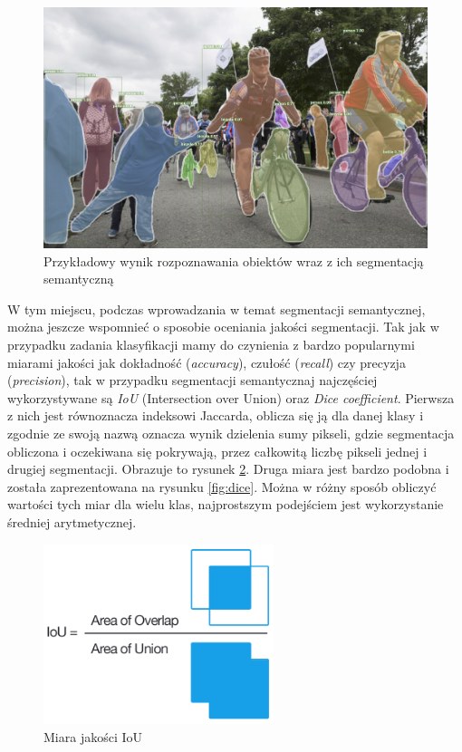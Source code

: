 \documentclass{classrep}
\begin{document}
{        \begin{figure}[!htbp]
            \centering
            \includegraphics[width=\textwidth]{img/instance_segmentation_example.jpg}
            \caption
            {Przykładowy wynik rozpoznawania obiektów wraz z ich segmentacją semantyczną \cite{url:instance_segmentation_example}}
            \label{fig:instance_segmentation_example}
        \end{figure}
        \FloatBarrier

        W tym miejscu, podczas wprowadzania w temat segmentacji semantycznej, można jeszcze wspomnieć o
        sposobie oceniania jakości segmentacji. Tak jak w przypadku zadania klasyfikacji mamy do czynienia z
        bardzo popularnymi miarami jakości jak dokładność (\emph{accuracy}), czułość (\emph{recall}) czy
        precyzja (\emph{precision}), tak w przypadku segmentacji semantycznaj najczęściej wykorzystywane są
        \emph{IoU} (Intersection over Union) oraz \emph{Dice coefficient}. Pierwsza z nich jest równoznacza
        indeksowi Jaccarda, oblicza się ją dla danej klasy i zgodnie ze swoją nazwą oznacza wynik dzielenia
        sumy pikseli, gdzie segmentacja obliczona i oczekiwana się pokrywają, przez całkowitą liczbę pikseli
        jednej i drugiej segmentacji. Obrazuje to rysunek \ref{fig:iou}. Druga miara jest bardzo podobna i
        została zaprezentowana na rysunku \ref{fig:dice}. Można w różny sposób obliczyć wartości tych miar
        dla wielu klas, najprostszym podejściem jest wykorzystanie średniej arytmetycznej.

        \begin{figure}[!htbp]
            \centering
            \includegraphics[width=0.6\textwidth]{img/iou.png}
            \caption{Miara jakości IoU \cite{url:iou}}
            \label{fig:iou}
        \end{figure}


}
\end{document}
